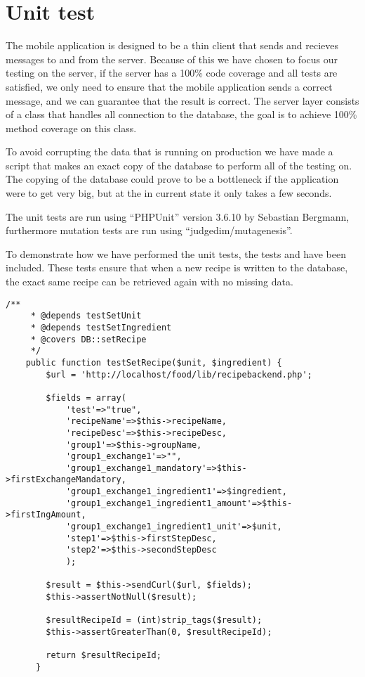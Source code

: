 \section{Unit test}
The mobile application is designed to be a thin client that sends and recieves messages to and from the server. Because of this we have chosen to focus our testing on the server, if the server has a 100\% code coverage and all tests are satisfied, we only need to ensure that the mobile application sends a correct message, and we can guarantee that the result is correct.
The server layer consists of a class that handles all connection to the database, the goal is to achieve 100\% method coverage on this class.

To avoid corrupting the data that is running on production we have made a script that makes an exact copy of the database to perform all of the testing on. The copying of the database could prove to be a bottleneck if the application were to get very big, but at the in current state it only takes a few seconds.

The unit tests are run using ``PHPUnit'' version 3.6.10 by Sebastian Bergmann, furthermore mutation tests are run using ``judgedim/mutagenesis''.

To demonstrate how we have performed the unit tests, the tests  and  have been included. These tests ensure that when a new recipe is written to the database, the exact same recipe can be retrieved again with no missing data.

\begin{lstlisting}[language=phpstyle]
    /**
     * @depends testSetUnit
     * @depends testSetIngredient
     * @covers DB::setRecipe
     */
    public function testSetRecipe($unit, $ingredient) {
        $url = 'http://localhost/food/lib/recipebackend.php';

        $fields = array(
            'test'=>"true",
            'recipeName'=>$this->recipeName,
            'recipeDesc'=>$this->recipeDesc,
            'group1'=>$this->groupName,
            'group1_exchange1'=>"",
            'group1_exchange1_mandatory'=>$this->firstExchangeMandatory,
            'group1_exchange1_ingredient1'=>$ingredient,
            'group1_exchange1_ingredient1_amount'=>$this->firstIngAmount,
            'group1_exchange1_ingredient1_unit'=>$unit,
            'step1'=>$this->firstStepDesc,
            'step2'=>$this->secondStepDesc
            );
        
        $result = $this->sendCurl($url, $fields);
        $this->assertNotNull($result);
            
        $resultRecipeId = (int)strip_tags($result);
        $this->assertGreaterThan(0, $resultRecipeId);
        
        return $resultRecipeId;
      }
\end{lstlisting}

